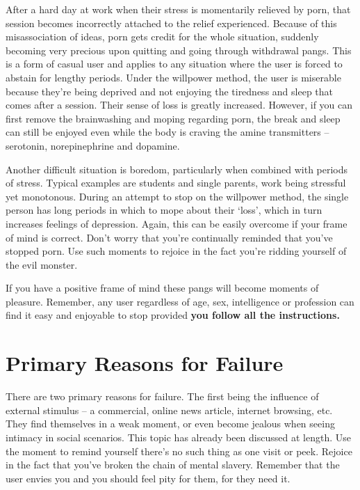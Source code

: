 \documentclass[
]{book}
\begin{document}
After a hard day at work when their stress is momentarily relieved by porn, that session becomes incorrectly attached to the relief experienced. Because of this misassociation of ideas, porn gets credit for the whole situation, suddenly becoming very precious upon quitting and going through withdrawal pangs. This is a form of casual user and applies to any situation where the user is forced to abstain for lengthy periods. Under the willpower method, the user is miserable because they're being deprived and not enjoying the tiredness and sleep that comes after a session. Their sense of loss is greatly increased. However, if you can first remove the brainwashing and moping regarding porn, the break and sleep can still be enjoyed even while the body is craving the amine transmitters -- serotonin, norepinephrine and dopamine.

Another difficult situation is boredom, particularly when combined with periods of stress. Typical examples are students and single parents, work being stressful yet monotonous. During an attempt to stop on the willpower method, the single person has long periods in which to mope about their `loss', which in turn increases feelings of depression. Again, this can be easily overcome if your frame of mind is correct. Don't worry that you're continually reminded that you've stopped porn. Use such moments to rejoice in the fact you're ridding yourself of the evil monster.

If you have a positive frame of mind these pangs will become moments of pleasure. Remember, any user regardless of age, sex, intelligence or profession can find it easy and enjoyable to stop provided \textbf{you follow all the instructions.}

\hypertarget{primary-reasons-for-failure}{%
\section{Primary Reasons for Failure}\label{primary-reasons-for-failure}}

There are two primary reasons for failure. The first being the influence of external stimulus -- a commercial, online news article, internet browsing, etc. They find themselves in a weak moment, or even become jealous when seeing intimacy in social scenarios. This topic has already been discussed at length. Use the moment to remind yourself there's no such thing as one visit or peek. Rejoice in the fact that you've broken the chain of mental slavery. Remember that the user envies you and you should feel pity for them, for they need it.
\end{document}
